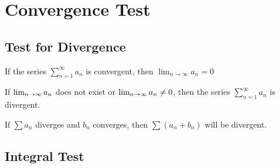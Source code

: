 \chapter{Convergence Test}

\section{Test for Divergence}

\begin{theorem}
  If the series \(\sum_{n = 1}^{\infty} a_{n}\) is convergent, then \(\lim_{n \to \infty} a_{n} = 0\)
\end{theorem}

\begin{corollary}
  If \(\lim_{n \to \infty} a_{n}\) does not exist or \(\lim_{n \to \infty} a_{n} \neq 0\), then the series \(\sum_{n = 1}^{\infty} a_{n}\) is divergent.
\end{corollary}

\begin{lemma}
  If \(\sum a_{n}\) diverges and \(b_{n}\) converges, then \(\sum (a_{n} + b_{n})\) will be divergent.
\end{lemma}


\section{Integral Test}

